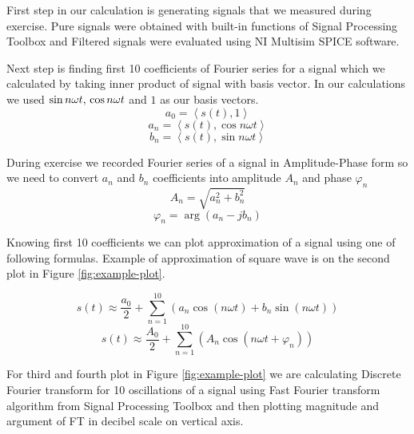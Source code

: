 \documentclass[notitlepage, a4paper, 11pt]{article}
\begin{document}
	First step in our calculation is generating signals that we measured during exercise. Pure signals were obtained with built-in functions of Signal Processing Toolbox and Filtered signals were evaluated using NI Multisim SPICE software.
		
	Next step is finding first 10 coefficients of Fourier series for a signal which we calculated by taking inner product of signal with basis vector. In our calculations we used $\sin n\omega t ,\thinspace \cos n\omega t$ and $1$ as our basis vectors.
	\begin{equation}\label{eq:a0}
		a_0 = \left\langle s(t), 1 \right\rangle
	\end{equation}
	\begin{equation}\label{eq:an}
		a_n = \left\langle s(t), \cos n\omega t \right\rangle
	\end{equation}
	\begin{equation}\label{eq:bn}
		b_n = \left\langle s(t), \sin n\omega t \right\rangle
	\end{equation}

	During exercise we recorded Fourier series of a signal in Amplitude-Phase form so we need to convert $a_n$ and $b_n$ coefficients into amplitude $A_n$ and phase $\varphi_n$
	\begin{equation}\label{eq:An}
		A_n = \sqrt{a_n^2 + b_n^2}
	\end{equation}
	\begin{equation}\label{eq:phi}
		\varphi_n = \arg(a_n - j b_n)
	\end{equation}
		
	Knowing first 10 coefficients we can plot approximation of a signal using one of following formulas. Example of approximation of square wave is on the second plot in Figure \ref{fig:example-plot}.
	
	\begin{equation}\label{eq:FS}
		s(t) \approx \frac{a_0}{2} + \sum_{n=1}^{10}(a_n\cos(n\omega t)+b_n\sin(n\omega t))
	\end{equation}
	\begin{equation}\label{eq:FSap}
		s(t) \approx \frac{A_0}{2} + \sum_{n=1}^{10}(A_n\cos(n\omega t +\varphi_n))
	\end{equation}

	For third and fourth plot in Figure \ref{fig:example-plot} we are calculating Discrete Fourier transform for 10 oscillations of a signal using Fast Fourier transform algorithm from Signal Processing Toolbox and then plotting magnitude and argument of FT in decibel scale on vertical axis.
\end{document}
